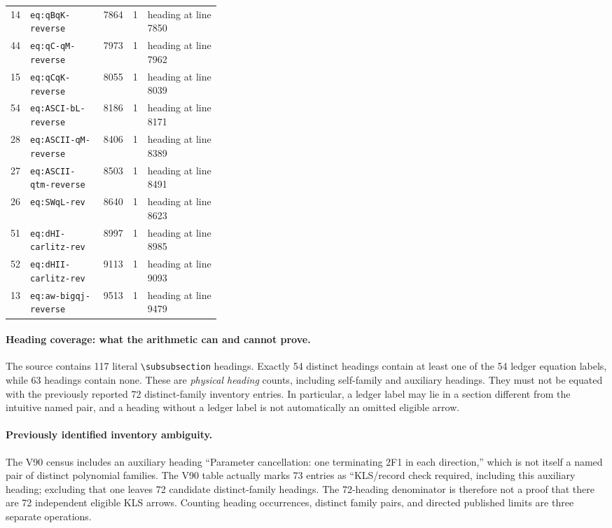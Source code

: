 \documentclass[11pt]{article}
\begin{document}
\begin{longtable}{@{}r l r r p{0.35\linewidth}@{}}
14 & \texttt{eq:qBqK-reverse} & 7864 & 1 & heading at line 7850 \\
44 & \texttt{eq:qC-qM-reverse} & 7973 & 1 & heading at line 7962 \\
15 & \texttt{eq:qCqK-reverse} & 8055 & 1 & heading at line 8039 \\
54 & \texttt{eq:ASCI-bL-reverse} & 8186 & 1 & heading at line 8171 \\
28 & \texttt{eq:ASCII-qM-reverse} & 8406 & 1 & heading at line 8389 \\
27 & \texttt{eq:ASCII-qtm-reverse} & 8503 & 1 & heading at line 8491 \\
26 & \texttt{eq:SWqL-rev} & 8640 & 1 & heading at line 8623 \\
51 & \texttt{eq:dHI-carlitz-rev} & 8997 & 1 & heading at line 8985 \\
52 & \texttt{eq:dHII-carlitz-rev} & 9113 & 1 & heading at line 9093 \\
13 & \texttt{eq:aw-bigqj-reverse} & 9513 & 1 & heading at line 9479 \\
\end{longtable}\endgroup
\paragraph{Heading coverage: what the arithmetic can and cannot prove.} The source contains 117 literal \verb|\subsubsection| headings. Exactly 54 distinct headings contain at least one of the 54 ledger equation labels, while 63 headings contain none. These are \emph{physical heading} counts, including self-family and auxiliary headings. They must not be equated with the previously reported 72 distinct-family inventory entries. In particular, a ledger label may lie in a section different from the intuitive named pair, and a heading without a ledger label is not automatically an omitted eligible arrow.

\paragraph{Previously identified inventory ambiguity.} The V90 census includes an auxiliary heading ``Parameter cancellation: one terminating 2F1 in each direction,'' which is not itself a named pair of distinct polynomial families. The V90 table actually marks 73 entries as ``KLS/record check required, including this auxiliary heading; excluding that one leaves 72 candidate distinct-family headings. The 72-heading denominator is therefore not a proof that there are 72 independent eligible KLS arrows. Counting heading occurrences, distinct family pairs, and directed published limits are three separate operations.
\end{document}
